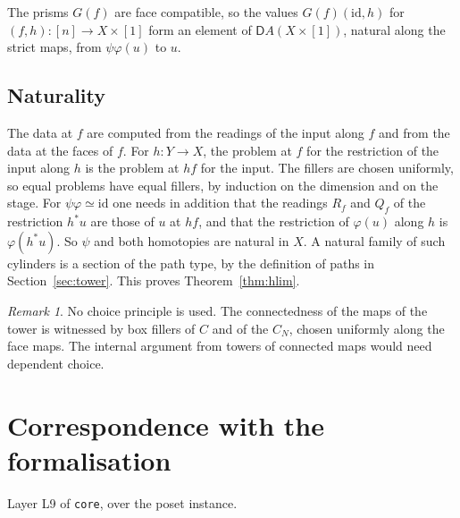 \documentclass[11pt]{article}
\newcommand{\id}{\mathrm{id}}
\newcommand{\D}{\mathsf{D}}
\theoremstyle{plain}
\theoremstyle{definition}
\theoremstyle{remark}
\newtheorem{remark}[theorem]{Remark}
\begin{document}
The prisms $G(f)$ are face compatible, so the values $G(f)(\id,h)$ for
$(f,h):[n]\to X\times[1]$ form an element of $\D A(X\times[1])$, natural
along the strict maps, from $\psi\varphi(u)$ to $u$.

\subsection{Naturality}

The data at $f$ are computed from the readings of the input along $f$ and
from the data at the faces of $f$. For $h:Y\to X$, the problem at $f$ for
the restriction of the input along $h$ is the problem at $hf$ for the
input. The fillers are chosen uniformly, so equal problems have equal
fillers, by induction on the dimension and on the stage. For
$\psi\varphi\simeq\id$ one needs in addition that the readings $R_f$ and
$Q_f$ of the restriction $h^*u$ are those of $u$ at $hf$, and that the
restriction of $\varphi(u)$ along $h$ is $\varphi(h^*u)$. So $\psi$ and
both homotopies are natural in $X$. A natural family of such cylinders is
a section of the path type, by the definition of paths in
Section~\ref{sec:tower}.
This proves Theorem~\ref{thm:hlim}.

\begin{remark}
No choice principle is used. The connectedness of the maps of the tower is
witnessed by box fillers of $C$ and of the $C_N$, chosen uniformly along
the face maps. The internal argument from towers of connected maps would
need dependent choice.
\end{remark}

\appendix
\section{Correspondence with the formalisation}

\noindent Layer L9 of \texttt{core}, over the poset instance.
\end{document}
